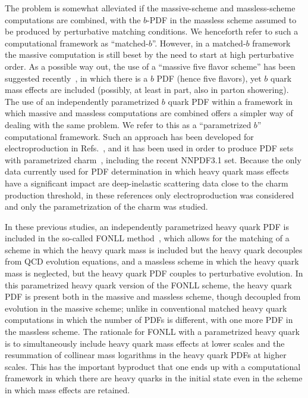 The problem is somewhat
alleviated if the massive-scheme and massless-scheme
computations are combined, with the $b$-PDF in the massless scheme assumed to be
produced by perturbative matching conditions.  We  henceforth refer to
such a computational 
framework as ``matched-$b$''. However, in a matched-$b$ framework the
massive computation is still beset by the need to start at high
perturbative order.
As a possible way out, the use of a ``massive five flavor scheme'' has
been suggested recently~\cite{Krauss:2017wmx,Figueroa:2018chn}, in
which there is a $b$ PDF (hence five flavors), yet $b$ quark mass
effects are included (possibly, at least in part, also in parton showering).
The use of an independently parametrized $b$ quark PDF
within a framework in which massive and massless computations are
combined
offers a simpler way of dealing with the same
problem. We  refer to this as a ``parametrized $b$''
computational framework.
Such an approach has been developed for electroproduction in
Refs.~\cite{Ball:2015tna,Ball:2015dpa}, and it has been used in order
to produce PDF sets with parametrized
charm~\cite{Ball:2016neh,Ball:2017nwa}, including the recent NNPDF3.1
set. Because the only data currently used for PDF determination in which 
heavy quark mass effects have  a significant impact are deep-inelastic
scattering data close  to the charm production threshold, in these
references only electroproduction was considered and only the
parametrization of the charm was studied.

In these previous studies, an independently parametrized heavy quark PDF is
included in the so-called FONLL  method~\cite{Cacciari:1998it},
which allows for the
matching of a scheme in which the heavy quark mass is included but the
heavy quark decouples from QCD evolution equations, and a massless
scheme in which the heavy quark mass is neglected, but the heavy quark
PDF couples to perturbative evolution.
In this parametrized heavy quark version of the FONLL scheme, the heavy
quark PDF is present both in the massive and massless scheme, though
decoupled from evolution in the massive scheme; unlike in conventional
matched heavy quark computations
in which the number of PDFs is different, with one more
PDF in the massless scheme. The rationale for FONLL
with a parametrized heavy quark is to simultaneously include heavy quark
mass effects at lower scales and
the resummation of collinear mass logarithms in the heavy quark PDFs at
higher scales. This has the important byproduct that one
ends up with a computational framework in which there are heavy quarks in
the initial state even in the scheme in which mass effects are
retained.


